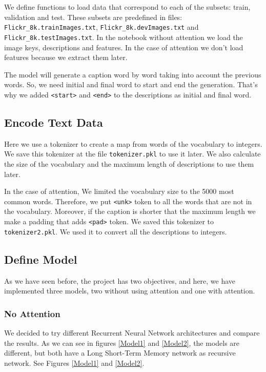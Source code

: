 \documentclass{article} %
\begin{document}
We define functions to load data that correspond to each of the subsets: train, validation and test. These subsets are predefined in files: \texttt{Flickr\_8k.trainImages.txt}, \texttt{Flickr\_8k.devImages.txt} and \texttt{Flickr\_8k.testImages.txt}. In the notebook without attention we load the image keys, descriptions and features. In the case of attention we don't load features because we extract them later.

The model will generate a caption word by word taking into account the previous words. So, we need initial and final word to start and end the generation. That's why we added \texttt{<start>} and \texttt{<end>} to the descriptions as initial and final word.

\subsection{Encode Text Data}

Here we use a tokenizer to create a map from words of the vocabulary to integers. We save this tokenizer at the file \texttt{tokenizer.pkl} to use it later. We also calculate the size of the vocabulary and the maximum length of descriptions to use them later.

In the case of attention, We limited the vocabulary size to the 5000 most common words. Therefore, we put \texttt{<unk>} token to all the words that are not in the vocabulary. Moreover, if the caption is shorter that the maximum length we make a padding that adds \texttt{<pad>} token. We saved this tokenizer to \texttt{tokenizer2.pkl}. We used it to convert all the descriptions to integers.

\subsection{Define Model}

As we have seen before, the project has two objectives, and here, we have implemented three models, two without using attention and one with attention. 

\subsubsection{No Attention}

We decided to try different Recurrent Neural Network architectures and compare the results. As we can see in figures \ref{Model1} and \ref{Model2}, the models are different, but both have a Long Short-Term Memory network as recursive network. See Figures \ref{Model1} and \ref{Model2}.
\end{document}
